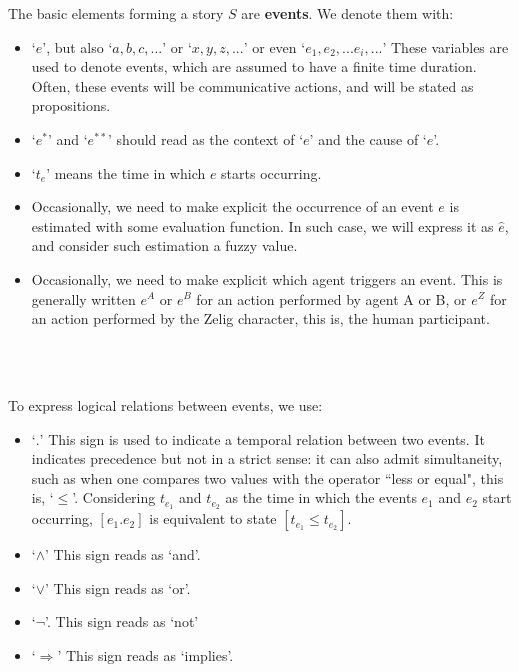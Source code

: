 \documentclass[
		twoside,openright,titlepage,numbers=noenddot,manychapters,
		headinclude,%
                footinclude=false,cleardoublepage=empty,
                BCOR=5mm,
		fontsize=11pt, %
                 enabledeprecatedfontcommands]{scrreprt}
\begin{document}
\label{notation}
The basic elements forming a story $S$ are \textbf{events}. We denote them with:
\begin{itemize}
  \item `$e$', but also `$a,b,c,...$' or `$x, y, z,...$' or even `$e_1, e_2, ...e_i, ...$' These variables are used to denote events, which are assumed to have a finite time duration. Often, these events will be communicative actions, and will be stated as propositions.
  \item `$e^{*}$' and `$e^{**}$' should read as the context of `$e$' and the cause of `$e$'.
  \item `$t_{e}$' means the time in which $e$ starts occurring. 
  \item Occasionally, we need to make explicit the occurrence of an event $e$ is estimated with some evaluation function. In such case, we will express it as $\hat{e}$, and consider such estimation a fuzzy value.
  \item Occasionally, we need to make explicit which agent triggers an event. This is generally written $e^A$ or $e^B$ for an action performed by agent A or B, or $e^Z$ for an action performed by the Zelig character, this is, the human participant.
\end{itemize}
\ \\ 
\

To express logical relations between events, we use:
\begin{itemize}
  \item `$.$' This sign is used to indicate a temporal relation between two events. It indicates precedence but not in a strict sense: it can also admit simultaneity, such as when one compares two values with the operator ``less or equal", this is, `$\leq$'. Considering $t_{e_1}$ and $t_{e_2}$ as the time in which the events $e_1$ and $e_2$ start occurring, $[e_1.e_2]$ is equivalent to state $[t_{e_1} \leq t_{e_2}]$.
  \item `$\wedge$' This sign reads as `and'.
  \item `$\vee$' This sign reads as `or'.
  \item `$\neg$'. This sign reads as `not'
  \item `$\Rightarrow$' This sign reads as `implies'.%
\end{itemize}
\end{document}
